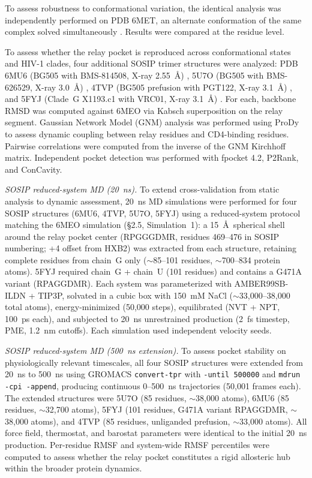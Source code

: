\documentclass[11pt,a4paper]{article}
\begin{document}
To assess robustness to conformational variation, the identical analysis was independently performed on PDB 6MET, an alternate conformation of the same complex solved simultaneously \citep{Shaik2019}. Results were compared at the residue level.

To assess whether the relay pocket is reproduced across conformational states and HIV-1 clades, four additional SOSIP trimer structures were analyzed: PDB 6MU6 (BG505 with BMS-814508, X-ray 2.55~\AA) \citep{Lai2019}, 5U7O (BG505 with BMS-626529, X-ray 3.0~\AA) \citep{Pancera2017}, 4TVP (BG505 prefusion with PGT122, X-ray 3.1~\AA) \citep{Pancera2014}, and 5FYJ (Clade~G X1193.c1 with VRC01, X-ray 3.1~\AA) \citep{StewartJones2016}. For each, backbone RMSD was computed against 6MEO via Kabsch superposition on the relay segment. Gaussian Network Model (GNM) analysis was performed using ProDy to assess dynamic coupling between relay residues and CD4-binding residues. Pairwise correlations were computed from the inverse of the GNM Kirchhoff matrix. Independent pocket detection was performed with fpocket 4.2, P2Rank, and ConCavity.

\textit{SOSIP reduced-system MD (20~ns).} To extend cross-validation from static analysis to dynamic assessment, 20~ns MD simulations were performed for four SOSIP structures (6MU6, 4TVP, 5U7O, 5FYJ) using a reduced-system protocol matching the 6MEO simulation (\S2.5, Simulation~1): a 15~\AA\ spherical shell around the relay pocket center (RPGGGDMR, residues 469--476 in SOSIP numbering; +4 offset from HXB2) was extracted from each structure, retaining complete residues from chain~G only (${\sim}$85--101 residues, ${\sim}$700--834 protein atoms). 5FYJ required chain~G + chain~U (101 residues) and contains a G471A variant (RPAGGDMR). Each system was parameterized with AMBER99SB-ILDN + TIP3P, solvated in a cubic box with 150~mM NaCl (${\sim}$33,000--38,000 total atoms), energy-minimized (50,000 steps), equilibrated (NVT + NPT, 100~ps each), and subjected to 20~ns unrestrained production (2~fs timestep, PME, 1.2~nm cutoffs). Each simulation used independent velocity seeds.

\textit{SOSIP reduced-system MD (500~ns extension).} To assess pocket stability on physiologically relevant timescales, all four SOSIP structures were extended from 20~ns to 500~ns using GROMACS \texttt{convert-tpr} with \texttt{-until 500000} and \texttt{mdrun -cpi -append}, producing continuous 0--500~ns trajectories (50,001 frames each). The extended structures were 5U7O (85 residues, ${\sim}$38,000 atoms), 6MU6 (85 residues, ${\sim}$32,700 atoms), 5FYJ (101 residues, G471A variant RPAGGDMR, ${\sim}$38,000 atoms), and 4TVP (85 residues, unliganded prefusion, ${\sim}$33,000 atoms). All force field, thermostat, and barostat parameters were identical to the initial 20~ns production. Per-residue RMSF and system-wide RMSF percentiles were computed to assess whether the relay pocket constitutes a rigid allosteric hub within the broader protein dynamics.
\end{document}
